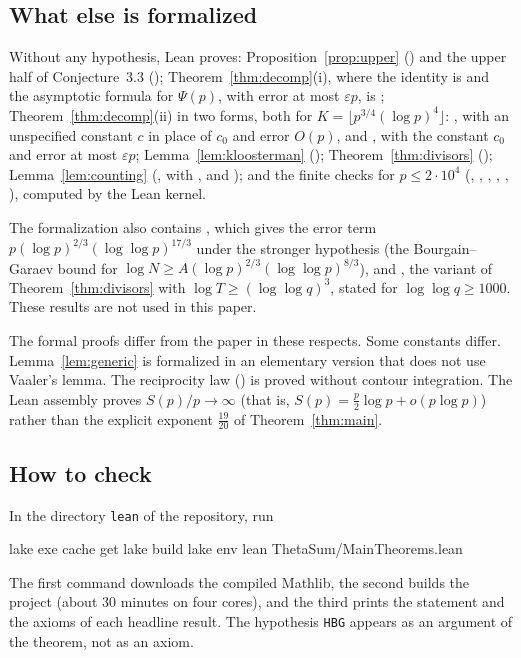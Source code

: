 \subsection*{What else is formalized}
Without any hypothesis, Lean proves: Proposition~\ref{prop:upper} () and the upper half of Conjecture~3.3 (); Theorem~\ref{thm:decomp}(i), where the identity is  and the asymptotic formula for $\Psi(p)$, with error at most $\varepsilon p$, is ; Theorem~\ref{thm:decomp}(ii) in two forms, both for $K=\lfloor p^{3/4}(\log p)^4\rfloor$: , with an unspecified constant $c$ in place of $c_0$ and error $O(p)$, and , with the constant $c_0$ and error at most $\varepsilon p$; Lemma~\ref{lem:kloosterman} (); Theorem~\ref{thm:divisors} (); Lemma~\ref{lem:counting} (, with ,  and ); and the finite checks for $p\le2\cdot10^4$ (, , , , , ), computed by the Lean kernel.

The formalization also contains , which gives the error term $p(\log p)^{2/3}(\log\log p)^{17/3}$ under the stronger hypothesis  (the Bourgain--Garaev bound for $\log N\ge A(\log p)^{2/3}(\log\log p)^{8/3}$), and , the variant of Theorem~\ref{thm:divisors} with $\log T\ge(\log\log q)^3$, stated for $\log\log q\ge1000$. These results are not used in this paper.

The formal proofs differ from the paper in these respects. Some constants differ. Lemma~\ref{lem:generic} is formalized in an elementary version that does not use Vaaler's lemma. The reciprocity law () is proved without contour integration. The Lean assembly proves $S(p)/p\to\infty$ (that is, $S(p)=\frac p2\log p+o(p\log p)$) rather than the explicit exponent $\frac{19}{20}$ of Theorem~\ref{thm:main}.

\subsection*{How to check}
In the directory \texttt{lean} of the repository, run
\begin{leancode}
lake exe cache get
lake build
lake env lean ThetaSum/MainTheorems.lean
\end{leancode}
The first command downloads the compiled Mathlib, the second builds the project (about 30 minutes on four cores), and the third prints the statement and the axioms of each headline result. The hypothesis \texttt{HBG} appears as an argument of the theorem, not as an axiom.
